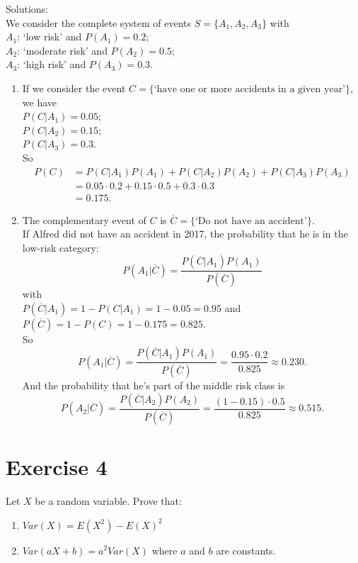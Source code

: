 \documentclass[12pt,thmsa]{article}
\begin{document}
\noindent Solutions:\\
\noindent We consider the complete system of events $S=\{A_{1}, A_{2},A_{3}\}$ with\\
$A_{1}$: `low risk' and $P(A_{1})=0.2$;\\
$A_{2}$: `moderate risk' and  $P(A_{2})=0.5$;\\
$A_{3}$: `high risk' and $ P(A_{3})=0.3$.

\begin{enumerate}
	\item If we consider the event $C=\{\mbox{`have one or more accidents in a given year'}\}$, we have\\
	$P(C|A_{1})=0.05$;\\
	$P(C|A_{2})=0.15$;\\
	$P(C|A_{3})=0.3$.\\
	So
	\begin{align*}
	P(C) &=P(C|A_{1})P(A_{1})+ P(C|A_{2})P(A_{2})+P(C|A_{3})P(A_{3})\\
	&= 0.05\cdot 0.2 + 0.15\cdot 0.5 + 0.3 \cdot 0.3\\
	&=0.175.
	\end{align*}
	\item The complementary event of $C$ is $\overline{C}=\{\mbox{`Do not have an accident'}\}$. \\
	If Alfred did not have an accident in 2017, the probability that he is in the low-risk category:\\
	$$P(A_{1}|\overline{C})=\frac{P(\overline{C}|A_{1})P(A_{1})}{P(\overline{C})}$$
	with\\
	$P(\overline{C}|A_{1})=1-P(C|A_{1})=1-0.05=0.95$ and\\
	$P(\overline{C})=1-P(C)=1-0.175= 0.825$.\\
	So\\
	$$P(A_{1}|\overline{C})= \frac{P(\overline{C}|A_{1}) P(A_{1})}{P(\overline{C})}=\frac{0.95\cdot0.2}{0.825}\approx0.230.$$
	 And the probability that he's part of the middle risk class is
	 $$P(A_{2}|\overline{C})=\frac{P(\overline{C}|A_{2})P(A_{2})}{P(\overline{C})}= \frac{(1-0.15)\cdot0.5}{0.825}\approx0.515.$$
	  
\end{enumerate}



\section*{Exercise 4}

Let $X$ be a random variable. Prove that: 
\begin{enumerate}
  \item $Var(X)=E(X^2)-E(X)^2$
  \item $Var(aX+b)=a^2 Var(X)$ where $a$ and $b$ are constants.
\end{enumerate}
\end{document}
